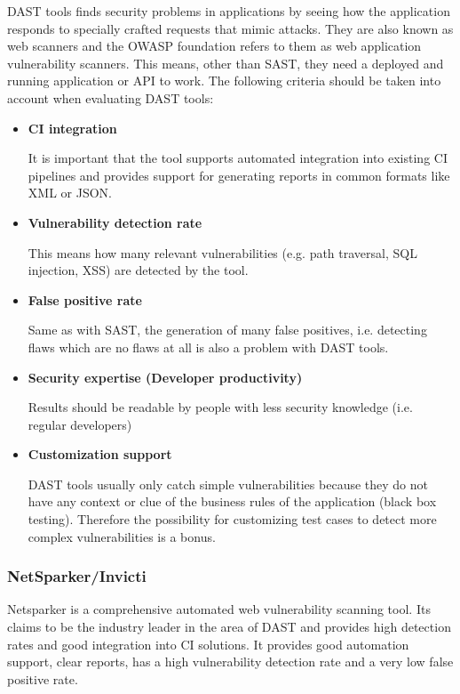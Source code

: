 \documentclass[conference]{IEEEtran}
\begin{document}
DAST tools finds security problems in applications by seeing how the application responds to specially crafted requests that mimic attacks. They are also known as web scanners and the OWASP foundation refers to them as web application vulnerability scanners. This means, other than SAST, they need a deployed and running application or API to work. The following criteria should be taken into account when evaluating DAST tools: \\

\begin{itemize}
	\item \textbf{CI integration}

	It is important that the tool supports automated integration into existing CI pipelines and provides support for generating reports in common formats like XML or JSON.
	
	\item \textbf{Vulnerability detection rate}
	
	This means how many relevant vulnerabilities (e.g. path traversal, SQL injection, XSS) are detected by the tool.
	
	\item \textbf{False positive rate}
	
	Same as with SAST, the generation of many false positives, i.e. detecting flaws which are no flaws at all is also a problem with DAST tools.

	\item \textbf{Security expertise (Developer productivity)}

	Results should be readable by people with less security knowledge (i.e. regular developers)

	\item \textbf{Customization support}

	DAST tools usually only catch simple vulnerabilities because they do not have any context or clue of the business rules of the application (black box testing). Therefore the possibility for customizing test cases to detect more complex vulnerabilities is a bonus.\\
\end{itemize}

\noindent
\subsubsection{NetSparker/Invicti \cite{dast1}}

Netsparker is a comprehensive automated web vulnerability scanning tool. Its claims to be the industry leader in the area of DAST and provides high detection rates and good integration into CI solutions. It provides good automation support, clear reports, has a high vulnerability detection rate and a very low false positive rate.
\end{document}
